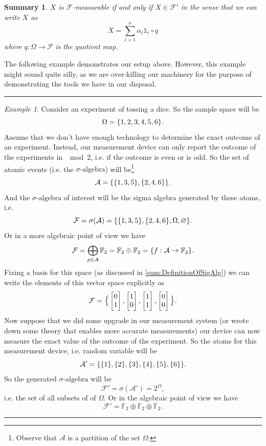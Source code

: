 \documentclass[11pt,a4paper]{article}
\newtheorem{summary}{Summary}
\theoremstyle{definition}
\theoremstyle{remark}
\newtheorem{example}{Example}
\begin{document}
	
	\begin{summary}
		$ X $ is $ \mathcal{F} $-measurable if and only if $ X \in \mathcal{F}' $ in the sense that we can write $ X $ as
		\[ X = \sum_{i=1}^n \alpha_i \mathds{1}_{i}\circ q \]
		where $ q: \Omega\to \mathcal{P} $ is the quotient map.
	\end{summary}
	
	The following example demonstrates our setup above. However, this example might sound quite silly, as we are over-killing our machinery for the purpose of demonstrating the tools we have in our disposal.
	
	\vspace{5pt}
	\hrule
	\begin{example}
		Consider an experiment of tossing a dice. So the sample space will be
		\[ \Omega = \{1,2,3,4,5,6\}. \]
		Assume that we don't have enough technology to determine the exact outcome of an experiment. Instead, our measurement device can only report the outcome of the experiments in $ \mod{2} $, i.e. if the outcome is even or is odd. So the set of atomic events (i.e. the $\sigma\text{-algebra}$) will be\footnote{Observe that $ \mathcal{A} $ is a partition of the set $ \Omega $.}
		\[ \mathcal{A} = \{\{1,3,5\},\{2,4,6\}\}. \]
		And the $\sigma\text{-algebra}$ of interest will be the sigma algebra generated by these atoms, i.e.
		\[ \mathcal{F} = \sigma(\mathcal{A}) = \{\{1,3,5\},\{2,4,6\},\Omega,\varnothing\}.\]
		Or in a more algebraic point of view we have
		\[ \mathcal{F}  = \bigoplus_{p\in \mathcal{A}}\mathbb{F}_2 = \mathbb{F}_2 \oplus \mathbb{F}_2 = \{f:\mathcal{A}\to \mathbb{F}_2\}. \]
		Fixing a basis for this space (as discussed in \autoref{sum:DefinitionOfSigAlg}) we can write the elements of this vector space explicitly as
		\[ \mathcal{F} = \big\{ \begin{bmatrix} 0 \\ 1 \end{bmatrix},\begin{bmatrix} 1 \\ 0 \end{bmatrix},\begin{bmatrix} 1 \\ 1 \end{bmatrix},\begin{bmatrix} 0 \\ 0 \end{bmatrix} \big\}. \]
		Now suppose that we did some upgrade in our measurement system (or wrote down some theory that enables more accurate measurements) our device can now measure the exact value of the outcome of the experiment. So the atoms for this measurement device, i.e. random variable will be
		\[ \mathcal{A}' = \{\{1\},\{2\},\{3\},\{4\},\{5\},\{6\}\}. \]
		So the generated $\sigma\text{-algebra}$ will be
		\[ \mathcal{F}' = \sigma(\mathcal{A}') = 2^\Omega, \]
		i.e. the set of all subsets of of $ \Omega $. Or in the algebraic point of view we have
		\[ \mathcal{F}' = \mathbb{F}_2 \oplus \mathbb{F}_2 \oplus \mathbb{F}_2. \]
	\end{example}
	\hrule
	
\end{document}

